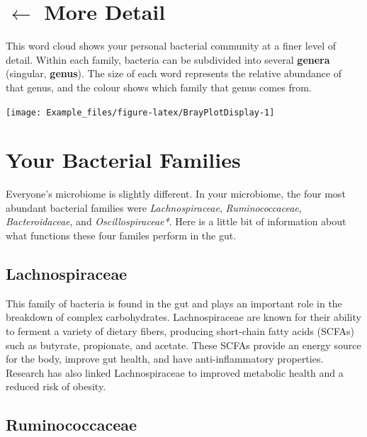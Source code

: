 \documentclass[
]{article}
\begin{document}
\begin{multicols}{2}
\section{$\boldsymbol{\leftarrow}$ More Detail}

\begin{small}
This word cloud shows your personal bacterial community at a finer 
level of detail. Within each family, bacteria can be subdivided into 
several \textbf{genera} (singular, \textbf{genus}). The size of each word
represents the relative abundance of that genus, and the colour shows
which family that genus comes from.
\end{small}

\begin{center}\texttt{[image: Example\_files/figure-latex/BrayPlotDisplay-1]} \end{center}

\section{Your Bacterial Families}

Everyone's microbiome is slightly different. In your microbiome, the
four most abundant bacterial families were \textit{Lachnospiraceae},
\textit{Ruminococcaceae}, \textit{Bacteroidaceae}, and
\textit{Oscillospiraceae*}. Here is a little bit of information about
what functions these four familes perform in the gut.

\vspace{1cm}

\subsection{Lachnospiraceae}

\begin{small}
This family of bacteria is found in the gut and plays an important role in the 
breakdown of complex carbohydrates. Lachnospiraceae are known for their ability 
to ferment a variety of dietary fibers, producing short-chain fatty acids 
(SCFAs) such as butyrate, propionate, and acetate. These SCFAs provide an energy
source for the body, improve gut health, and have anti-inflammatory properties. 
Research has also linked Lachnospiraceae to improved metabolic health and a 
reduced risk of obesity.
\end{small}

\subsection{Ruminococcaceae}


\end{multicols}
\end{document}
